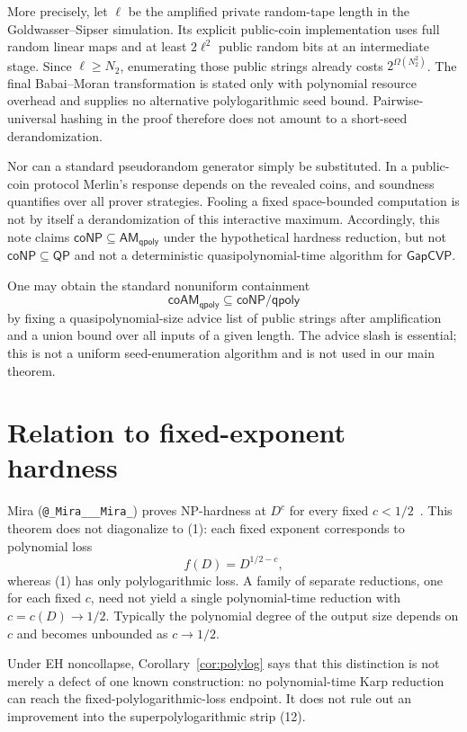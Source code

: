 \documentclass[11pt]{article}
\newcommand{\GapCVP}{\mathsf{GapCVP}}
\newcommand{\coAM}{\mathsf{coAM}}
\newcommand{\AM}{\mathsf{AM}}
\newcommand{\qpoly}{\mathsf{qpoly}}
\begin{document}
More precisely, let $\ell$ be the amplified private random-tape length in the
Goldwasser--Sipser simulation.  Its explicit public-coin implementation uses
full random linear maps and at least $2\ell^2$ public random bits at an
intermediate stage.  Since $\ell\ge N_2$, enumerating those public strings
already costs $2^{\Omega(N_2^2)}$.  The final Babai--Moran transformation is
stated only with polynomial resource overhead and supplies no alternative
polylogarithmic seed bound.  Pairwise-universal hashing in the proof therefore
does not amount to a short-seed derandomization.

Nor can a standard pseudorandom generator simply be substituted.  In a
public-coin protocol Merlin's response depends on the revealed coins, and
soundness quantifies over all prover strategies.  Fooling a fixed
space-bounded computation is not by itself a derandomization of this
interactive maximum.  Accordingly, this note claims
$\mathsf{coNP}\subseteq\AM_{\qpoly}$ under the hypothetical hardness
reduction, but not $\mathsf{coNP}\subseteq\mathsf{QP}$ and not a
deterministic quasipolynomial-time algorithm for $\GapCVP$.

One may obtain the standard nonuniform containment
\[
  \coAM_{\qpoly}\subseteq\mathsf{coNP}/\qpoly
\]
by fixing a quasipolynomial-size advice list of public strings after
amplification and a union bound over all inputs of a given length.  The advice
slash is essential; this is not a uniform seed-enumeration algorithm and is
not used in our main theorem.

\section{Relation to fixed-exponent hardness}

Mira (\texttt{@\_Mira\_\_\_Mira\_}) proves NP-hardness at $D^c$ for every
fixed $c<1/2$~\cite{Mira26}.  This theorem does not diagonalize to (1): each
fixed exponent corresponds to polynomial loss
\[
  f(D)=D^{1/2-c},
\]
whereas (1) has only polylogarithmic loss.  A family of separate reductions,
one for each fixed $c$, need not yield a single polynomial-time reduction with
$c=c(D)\to1/2$.  Typically the polynomial degree of the output size depends on
$c$ and becomes unbounded as $c\to1/2$.

Under EH noncollapse, Corollary~\ref{cor:polylog} says that this distinction is
not merely a defect of one known construction: no polynomial-time Karp
reduction can reach the fixed-polylogarithmic-loss endpoint.  It does not rule
out an improvement into the superpolylogarithmic strip (12).
\end{document}
